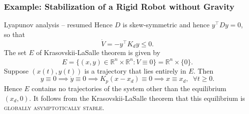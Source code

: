 \begin{frame}
    \frametitle{Example: Stabilization of a Rigid Robot without Gravity}

    \begin{block}{Lyapunov analysis -- resumed}
        Hence $D$ is skew-symmetric and hence $y^\top D y = 0$, so that
        \[\dot{V} = -y^\top K_d y \leq 0. \] The set $E$ of Krasovskii-LaSalle
        theorem is given by \[ E = \{ (x,y) \in \mathbb{R}^n \times
        \mathbb{R}^n: \dot{V} \equiv 0 \} = \mathbb{R}^n \times \{0\}. \]
        Suppose $(x(t), y(t))$ is a trajectory that lies entirely in $E$. Then
        \[ y \equiv 0 \implies \dot{y} \equiv 0 \implies K_p(x-x_d) \equiv 0
        \implies x \equiv x_d, \;\; \forall t \geq 0. \] Hence $E$ contains no 
        trajectories of the system other than the equilibrium $(x_d, 0)$. It 
        follows from the Krasovskii-LaSalle theorem that this equilibrium is 
        \textsc{globally asymptotically stable}.
    \end{block}
\end{frame}

\endgroup
